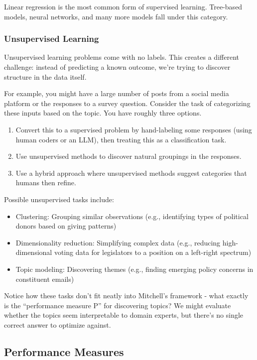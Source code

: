 Linear regression is the most common form of supervised learning. Tree-based models, neural networks, and many more models fall under this category.

\subsubsection{Unsupervised Learning}

Unsupervised learning problems come with no labels. This creates a different challenge: instead of predicting a known outcome, we're trying to discover structure in the data itself.

For example, you might have a large number of posts from a social media platform or the responses to a survey question. Consider the task of categorizing these inputs based on the topic. You have roughly three options.

\begin{enumerate}
\item Convert this to a supervised problem by hand-labeling some responses (using human coders or an LLM), then treating this as a classification task.
\item Use unsupervised methods to discover natural groupings in the responses.
\item Use a hybrid approach where unsupervised methods suggest categories that humans then refine.
\end{enumerate}

Possible unsupervised tasks include:

\begin{itemize}
\item Clustering: Grouping similar observations (e.g., identifying types of political donors based on giving patterns)
\item Dimensionality reduction: Simplifying complex data (e.g., reducing high-dimensional voting data for legislators to a position on a left-right spectrum)
\item Topic modeling: Discovering themes (e.g., finding emerging policy concerns in constituent emails)
\end{itemize}

Notice how these tasks don't fit neatly into Mitchell's framework - what exactly is the ``performance measure P'' for discovering topics? We might evaluate whether the topics seem interpretable to domain experts, but there's no single correct answer to optimize against.

\subsection{Performance Measures}

